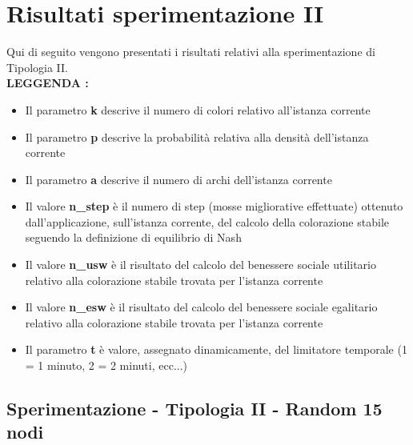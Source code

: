 \section{Risultati sperimentazione II}
\justify
Qui di seguito vengono presentati i risultati relativi alla sperimentazione di Tipologia II.\\

\textbf{LEGGENDA : }

\begin{itemize}
	\item Il parametro \textbf{k} descrive il numero di colori relativo all'istanza corrente
	\item Il parametro \textbf{p} descrive la probabilità relativa alla densità dell'istanza corrente
	\item Il parametro \textbf{a} descrive il numero di archi dell'istanza corrente
	\item Il valore \textbf{n\_step} è il numero di step (mosse migliorative effettuate) ottenuto dall'applicazione, sull'istanza corrente, del calcolo della colorazione stabile seguendo la definizione di equilibrio di Nash
	\item Il valore \textbf{n\_usw} è il risultato del calcolo del benessere sociale utilitario relativo alla colorazione stabile trovata per l'istanza corrente
	\item Il valore \textbf{n\_esw} è il risultato del calcolo del benessere sociale egalitario relativo alla colorazione stabile trovata per l'istanza corrente
	\item Il parametro \textbf{t} è valore, assegnato dinamicamente, del limitatore temporale (1 = 1 minuto, 2 = 2 minuti, ecc...)
\end{itemize}

\subsection{Sperimentazione - Tipologia II - Random 15 nodi}

